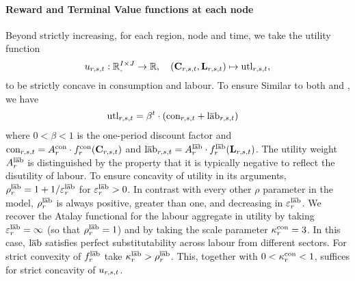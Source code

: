 \documentclass[12pt,a4paper,twoside, draft]{article}
\begin{document}
\paragraph{Reward and Terminal Value functions at each node}
Beyond strictly increasing, for each region, node and time, we take the utility
function
\[
u_{r, \node, t}: \nnreal^{I \times J} \rightarrow \R, \quad
  (\mathbf{C}_{r, \node, t}, \mathbf{L}_{r, \node, t})
    \mapsto \textup{utl}_{r, \node, t},
\]
 to be strictly concave in consumption and labour.
To ensure 
Similar to both \citet{Atalay-Sectoral_shocks} and \citet{CJ}, we have
\begin{align*}
  \textup{utl}_{r, {s}, t}
    &= \beta^{t}
      \cdot \left(
        \textup{c}\textup{o}\textup{n}_{r, {s}, t} + \textup{l}\overline{\textup{a}}\textup{b}_{r, {s}, t}
      \right)
\end{align*}
where $0 < \beta < 1$ is the one-period discount factor and $\textup{c}\textup{o}\textup{n}_{r, {s}, t}
  = A_{r}^{\textup{c}\textup{o}\textup{n}} \cdot f_{r}^{\textup{c}\textup{o}\textup{n}}(\mathbf{C}_{r, {s}, t})$
and $\textup{l}\overline{\textup{a}}\textup{b}_{r, {s}, t}
  = A_{r}^{\textup{l}\overline{\textup{a}}\textup{b}} \cdot f_{r}^{\textup{l}\overline{\textup{a}}\textup{b}}(\mathbf{L}_{r, {s}, t})$.
The utility weight $A_{r}^{\textup{l}\overline{\textup{a}}\textup{b}}$ is distinguished by the property that
it is typically negative to reflect the disutility of labour.
To ensure concavity of utility in its arguments, 
$\rho_{r}^{\textup{l}\overline{\textup{a}}\textup{b}} = 1 + 1 / \varepsilon_{r}^{\textup{l}\overline{\textup{a}}\textup{b}}$ for
$\varepsilon_{r}^{\textup{l}\overline{\textup{a}}\textup{b}} > 0$.
In contrast with every other $\rho$ parameter in the model, $\rho_{r}^{\textup{l}\overline{\textup{a}}\textup{b}}$ is
always positive, greater than one, and decreasing in $\varepsilon_{r}^{\textup{l}\overline{\textup{a}}\textup{b}}$.
We recover the Atalay functional for the labour aggregate in utility by taking
$\varepsilon_{r}^{\textup{l}\overline{\textup{a}}\textup{b}} = \infty$ (so that $\rho_{r}^{\textup{l}\overline{\textup{a}}\textup{b}} = 1$) and by taking
the scale parameter $\kappa_{r}^{\textup{c}\textup{o}\textup{n}} = 3$.
In this case, $\textup{l}\overline{\textup{a}}\textup{b}$ satisfies perfect substitutability across labour from
different sectors.
For strict convexity of $f_{r}^{\textup{l}\overline{\textup{a}}\textup{b}}$ take
$\kappa_{r}^{\textup{l}\overline{\textup{a}}\textup{b}} > \rho_{r}^{\textup{l}\overline{\textup{a}}\textup{b}}$.
This, together with $0 <\kappa_{r}^{\textup{c}\textup{o}\textup{n}} < 1$, suffices for strict
concavity of $u_{r, {s}, t}$.
\end{document}
